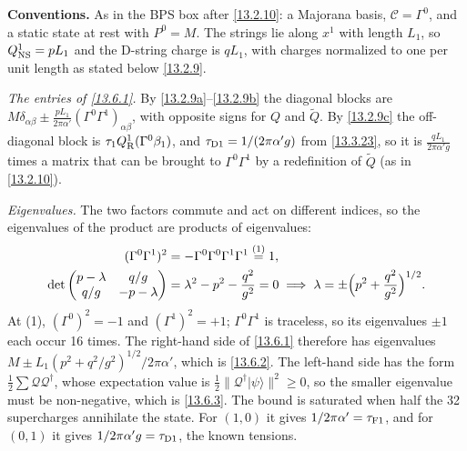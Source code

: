 \begin{tcolorbox}[breakable]
	\begin{remark}
		\textbf{Conventions.} As in the BPS box after \eqref{13.2.10}: a Majorana basis, $\mathcal C=\Gamma^0$, and a static state at rest with $P^0=M$. The strings lie along $x^1$ with length $L_1$, so $Q^1_{\rm NS}=pL_1$ and the D-string charge is $qL_1$, with charges normalized to one per unit length as stated below \eqref{13.2.9}.

		\textit{The entries of \eqref{13.6.1}.} By \eqref{13.2.9a}--\eqref{13.2.9b} the diagonal blocks are $M\delta_{\alpha\beta}\pm\frac{pL_1}{2\pi\alpha'}(\Gamma^0\Gamma^1)_{\alpha\beta}$, with opposite signs for $Q$ and $\tilde Q$. By \eqref{13.2.9c} the off-diagonal block is $\tau_1Q_{\rm R}^1(\Gamma^0\beta_1)$, and $\tau_{\rm D1}=1/(2\pi\alpha'g)$ from \eqref{13.3.23}, so it is $\frac{qL_1}{2\pi\alpha' g}$ times a matrix that can be brought to $\Gamma^0\Gamma^1$ by a redefinition of $\tilde Q$ (as in \eqref{13.2.10}).

		\textit{Eigenvalues.} The two factors commute and act on different indices, so the eigenvalues of the product are products of eigenvalues:
		\begin{align*}
			(\Gamma^0\Gamma^1)^2 &= -\Gamma^0\Gamma^0\Gamma^1\Gamma^1 \overset{(1)}{=} 1 ,\\
			\det\begin{pmatrix} p-\lambda & q/g \\ q/g & -p-\lambda\end{pmatrix} &= \lambda^2-p^2-\frac{q^2}{g^2}=0 \;\Longrightarrow\; \lambda=\pm\Bigl(p^2+\frac{q^2}{g^2}\Bigr)^{1/2} .
		\end{align*}
		At (1), $(\Gamma^0)^2=-1$ and $(\Gamma^1)^2=+1$; $\Gamma^0\Gamma^1$ is traceless, so its eigenvalues $\pm1$ each occur 16 times. The right-hand side of \eqref{13.6.1} therefore has eigenvalues $M\pm L_1(p^2+q^2/g^2)^{1/2}/2\pi\alpha'$, which is \eqref{13.6.2}. The left-hand side has the form $\frac12\sum\mathcal Q\mathcal Q^\dagger$, whose expectation value is $\frac12\|\mathcal Q^\dagger|\psi\rangle\|^2\ge0$, so the smaller eigenvalue must be non-negative, which is \eqref{13.6.3}. The bound is saturated when half the 32 supercharges annihilate the state. For $(1,0)$ it gives $1/2\pi\alpha'=\tau_{\rm F1}$, and for $(0,1)$ it gives $1/2\pi\alpha'g=\tau_{\rm D1}$, the known tensions.
	\end{remark}
\end{tcolorbox}

